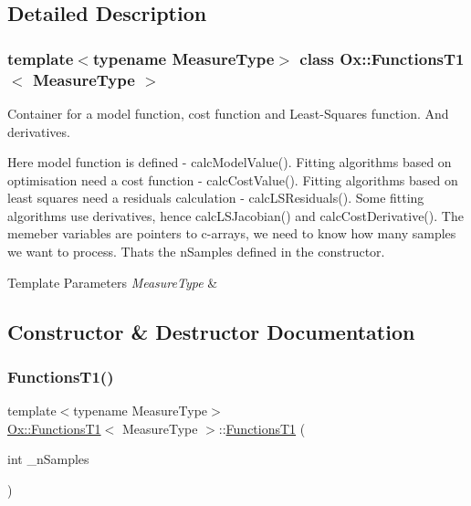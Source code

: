 \subsection{Detailed Description}
\subsubsection*{template$<$typename Measure\+Type$>$\newline
class Ox\+::\+Functions\+T1$<$ Measure\+Type $>$}

Container for a model function, cost function and Least-\/\+Squares function. And derivatives. 

Here model function is defined -\/ calc\+Model\+Value(). Fitting algorithms based on optimisation need a cost function -\/ calc\+Cost\+Value(). Fitting algorithms based on least squares need a residuals calculation -\/ calc\+L\+S\+Residuals(). Some fitting algorithms use derivatives, hence calc\+L\+S\+Jacobian() and calc\+Cost\+Derivative(). The memeber variables are pointers to c-\/arrays, we need to know how many samples we want to process. Thats the n\+Samples defined in the constructor. 
\begin{DoxyTemplParams}{Template Parameters}
{\em Measure\+Type} & \\
\hline
\end{DoxyTemplParams}


\subsection{Constructor \& Destructor Documentation}
\mbox{\label{class_ox_1_1_functions_t1_adbc02455598a334eb577c243d158545c}} 
\subsubsection{\texorpdfstring{Functions\+T1()}{FunctionsT1()}}
{\footnotesize\ttfamily template$<$typename Measure\+Type$>$ \\
\mbox{\hyperlink{class_ox_1_1_functions_t1}{Ox\+::\+Functions\+T1}}$<$ Measure\+Type $>$\+::\mbox{\hyperlink{class_ox_1_1_functions_t1}{Functions\+T1}} (\begin{DoxyParamCaption}\item[{int}]{\+\_\+n\+Samples }\end{DoxyParamCaption})\hspace{0.3cm}{\ttfamily [inline]}}



